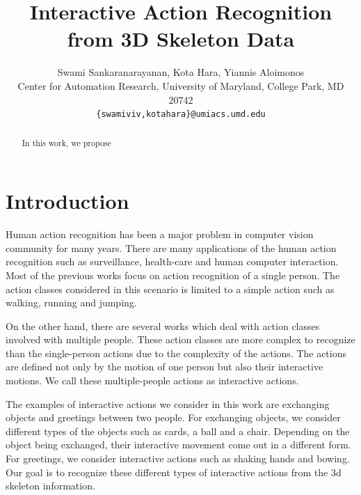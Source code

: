 \documentclass[10pt,twocolumn,letterpaper]{article}
\begin{document}
\title{Interactive Action Recognition from 3D Skeleton Data}

\author{Swami Sankaranarayanan, Kota Hara, Yiannis Aloimonos\\
Center for Automation Research, University of Maryland, College Park, MD 20742\\
{\tt\small \{swamiviv,kotahara\}@umiacs.umd.edu}
}


\maketitle

\begin{abstract}
In this work, we propose 
   
\end{abstract}

\section{Introduction}
Human action recognition has been a major problem in computer vision community for many years. There are many applications of the human action recognition such as surveillance, health-care and human computer interaction. Most of the previous works focus on action recognition of a single person. The action classes considered in this scenario is limited to a simple action such as walking, running and jumping. 

On the other hand, there are several works which deal with action classes involved with multiple people. These action classes are more complex to recognize than the single-person actions due to the complexity of the actions. The actions are defined not only by the motion of one person but also their interactive motions. We call these multiple-people actions as interactive actions.

The examples of interactive actions we consider in this work are exchanging objects and greetings between two people. For exchanging objects, we consider different types of the objects such as cards, a ball and a chair. Depending on the object being exchanged, their interactive movement come out in a different form. For greetings, we consider interactive actions such as shaking hands and bowing. Our goal is to recognize these different types of interactive actions from the 3d skeleton information.
\end{document}
